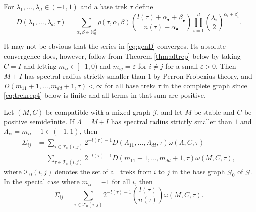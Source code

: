 \documentclass[10pt,twoside,a4paper]{amsart}
\begin{document}
\begin{definition} \label{dfn:D} For $\lambda_1, \ldots, \lambda_d \in (-1, 1)$ and a 
    base trek $\tau$ define
    \begin{equation} \label{eq:genD}
    D(\lambda_1, \ldots, \lambda_d, \tau) = \sum_{\alpha, \beta \in \mathbb{N}_0^d}
    \rho(\tau, \alpha, \beta)
    {l(\tau) + \alpha_{\bullet} + \beta_{\bullet} \choose n(\tau) + \alpha_{\bullet}} 
    \prod_{i=1}^d \left(\frac{\lambda_i}{2}\right)^{\alpha_i + \beta_i}.
    \end{equation}
\end{definition}

It may not be obvious that the series in \eqref{eq:genD} converges. Its 
absolute convergence does, however, follow from Theorem \ref{thm:altrep} below
by taking $C = I$ and letting $m_{ii} \in [-1, 0)$ and $m_{ij} = \varepsilon$ 
for $i \neq j$ for a small $\varepsilon > 0$. Then $M + I$ has spectral radius 
strictly smaller than $1$ by Perron-Frobenius theory, and 
$D(m_{11} + 1, \ldots, m_{dd} + 1, \tau) < \infty$ for all base treks $\tau$
in the complete graph since \eqref{eq:trekrep4} below is finite and 
all terms in that sum are positive.



\begin{theorem} \label{thm:altrep} 
    Let $(M, C)$ be compatible with a mixed graph $\mathcal{G}$, and let $M$ 
    be stable and $C$ be positive semidefinite. If $\Lambda = M + I$ has spectral radius strictly smaller
    than $1$ and \mbox{$\Lambda_{ii} = m_{ii} + 1\in (-1, 1)$}, then
    \begin{align} \label{eq:trekrep3}
        \Sigma_{ij} & = \sum_{\tau \in \mathcal{T}_0(i,j)} 
        2^{-l(\tau) - 1} D(\Lambda_{11}, \ldots, \Lambda_{dd}, \tau)
        \omega(\Lambda, C, \tau) \\
        \label{eq:trekrep4}
        & = \sum_{\tau \in \mathcal{T}_0(i,j)} 
        2^{-l(\tau) - 1} D(m_{11} + 1, \ldots, m_{dd} + 1, \tau)
        \omega(M, C, \tau),
    \end{align}
    where $\mathcal{T}_0(i,j)$ denotes the set of all treks from $i$ to
    $j$ in the base graph $\mathcal{G}_0$ of $\mathcal{G}$. In the special case 
    where $m_{ii} = -1$ for all $i$, then 
    \begin{equation} \label{eq:trekrep5}
        \Sigma_{ij} = \sum_{\tau \in \mathcal{T}_0(i,j)} 
        2^{-l(\tau) - 1} {l(\tau) \choose n(\tau)}
        \omega(M, C, \tau).
    \end{equation}
\end{theorem}
\end{document}
